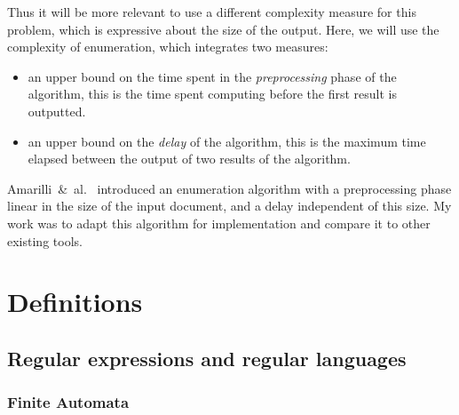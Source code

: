 \documentclass[12px]{article}
\theoremstyle{definition}
\begin{document}
    Thus it will be more relevant to use a different complexity measure for
    this problem, which is expressive about the size of the output. Here, we
    will use the complexity of enumeration, which integrates two measures:

    \begin{itemize}
      \item an upper bound on the time spent in the \textit{preprocessing}
        phase of the algorithm, this is the time spent computing before the
        first result is outputted.
      \item an upper bound on the \textit{delay} of the algorithm, this is
        the maximum time elapsed between the output of two results of the
        algorithm.
    \end{itemize}

    Amarilli~\&~al.~\cite{ICDT19} introduced an enumeration algorithm with a
    preprocessing phase linear in the size of the input document, and a delay
    independent of this size. My work was to adapt this algorithm for
    implementation and compare it to other existing tools.


  \section{Definitions}

    \subsection{Regular expressions and regular languages}

      \subsubsection{Finite Automata}
\end{document}
